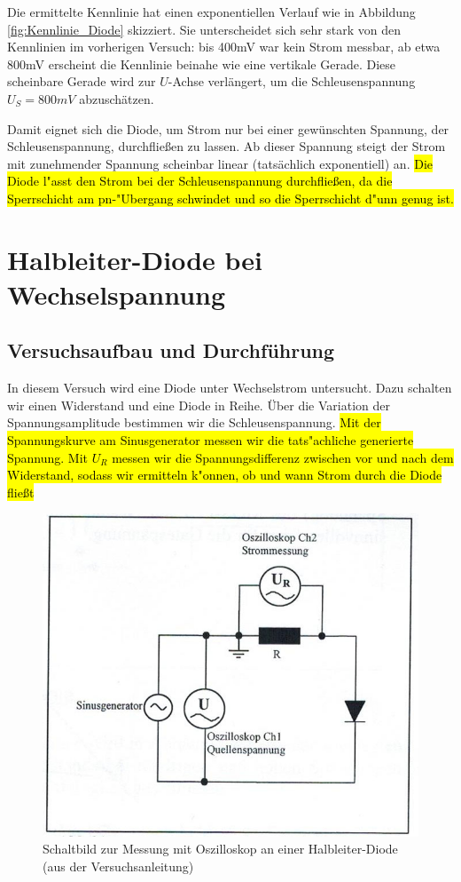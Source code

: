 \documentclass{scrartcl}
\begin{document}
Die ermittelte Kennlinie hat einen exponentiellen Verlauf wie in Abbildung \ref{fig:Kennlinie_Diode} skizziert. Sie unterscheidet sich sehr stark von den Kennlinien im vorherigen Versuch: bis 400mV war kein Strom messbar, ab etwa 800mV erscheint die Kennlinie beinahe wie eine vertikale Gerade. Diese scheinbare Gerade wird zur $U$-Achse verlängert, um die Schleusenspannung $U_{S} = 800mV$ abzuschätzen.

Damit eignet sich die Diode, um Strom nur bei einer gewünschten Spannung, der Schleusenspannung, durchfließen zu lassen. Ab dieser Spannung steigt der Strom mit zunehmender Spannung scheinbar linear (tatsächlich exponentiell) an.
\hl{Die Diode l"asst den Strom bei der Schleusenspannung durchflie\ss{}en, da die Sperrschicht am pn-"Ubergang schwindet und so die Sperrschicht d"unn genug ist. }


\pagebreak
\section{Halbleiter-Diode bei Wechselspannung}
\subsection{Versuchsaufbau und Durchführung}
In diesem Versuch wird eine Diode unter Wechselstrom untersucht. Dazu schalten wir einen Widerstand und eine Diode in Reihe. Über die Variation der Spannungsamplitude bestimmen wir die Schleusenspannung. \hl{Mit der Spannungskurve am Sinusgenerator messen wir die tats"achliche generierte Spannung. Mit $U_R$ messen wir die Spannungsdifferenz zwischen vor und nach dem Widerstand, sodass wir ermitteln k"onnen, ob und wann Strom durch die Diode flie\ss{}t}
\begin{figure}[H]
  \centering
    \includegraphics[scale=0.75]{Aufbau3.JPG}
  \caption{Schaltbild zur Messung mit Oszilloskop an einer Halbleiter-Diode (aus der Versuchsanleitung)}
  \label{fig:Aufbau3}
\end{figure}
\end{document}
